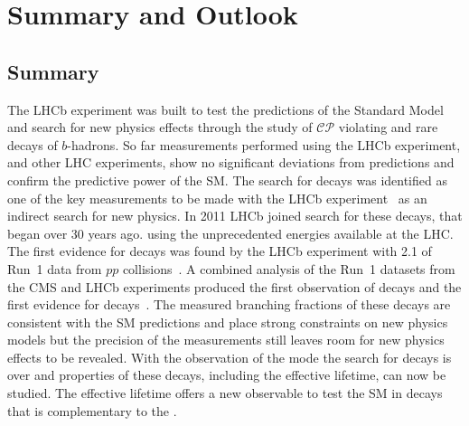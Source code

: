 \chapter{Summary and Outlook}
\label{sec:summaryandoutlook}

\section{Summary}
The LHCb experiment was built to test the predictions of the Standard Model and search for new physics effects through the study of $\mathcal{CP}$ violating and rare decays of $b$-hadrons. So far measurements performed using the LHCb experiment, and other LHC experiments, show no significant deviations from predictions and confirm the predictive power of the SM. 
The search for \bmumu decays was identified as one of the key measurements to be made with the LHCb experiment~\cite{Adeva:2009ny} as an indirect search for new physics.
In 2011 LHCb joined search for these decays, that began over 30 years ago. using the unprecedented energies available at the LHC. The first evidence for \bsmumu decays was found by the LHCb experiment with 2.1 \fb of Run~1 data from $pp$ collisions~\cite{Aaij:2012nna,}. A combined analysis of the Run~1 datasets from the CMS and LHCb experiments produced the first observation of \bsmumu decays and the first evidence for \bdmumu decays~\cite{CMS:2014xfa}. The measured branching fractions of these decays are consistent with the SM predictions and place strong constraints on new physics models but the precision of the measurements still leaves room for new physics effects to be revealed. With the observation of the \bs mode the search for \bsmumu decays is over and properties of these decays, including the effective lifetime, can now be studied. The effective lifetime offers a new observable to test the SM in \bsmumu decays that is complementary to the \BF. 

